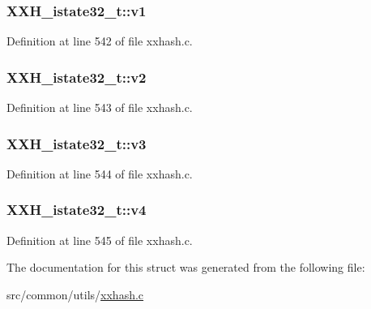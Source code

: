 \hypertarget{struct_x_x_h__istate32__t_abe7ccbc29303d4f4126d7c1c6003e67a}{}
\subsubsection[{v1}]{ X\+X\+H\+\_\+istate32\+\_\+t\+::v1}\label{struct_x_x_h__istate32__t_abe7ccbc29303d4f4126d7c1c6003e67a}


Definition at line 542 of file xxhash.\+c.

\hypertarget{struct_x_x_h__istate32__t_a2e56f8d3931253d5706f6354c228e7c4}{}
\subsubsection[{v2}]{ X\+X\+H\+\_\+istate32\+\_\+t\+::v2}\label{struct_x_x_h__istate32__t_a2e56f8d3931253d5706f6354c228e7c4}


Definition at line 543 of file xxhash.\+c.

\hypertarget{struct_x_x_h__istate32__t_ae19dc091e2c1c51e516024137603cd4a}{}
\subsubsection[{v3}]{ X\+X\+H\+\_\+istate32\+\_\+t\+::v3}\label{struct_x_x_h__istate32__t_ae19dc091e2c1c51e516024137603cd4a}


Definition at line 544 of file xxhash.\+c.

\hypertarget{struct_x_x_h__istate32__t_a8ca5625843153eb81437e9cee7364c1c}{}
\subsubsection[{v4}]{ X\+X\+H\+\_\+istate32\+\_\+t\+::v4}\label{struct_x_x_h__istate32__t_a8ca5625843153eb81437e9cee7364c1c}


Definition at line 545 of file xxhash.\+c.



The documentation for this struct was generated from the following file\+:\begin{DoxyCompactItemize}
\item 
src/common/utils/\hyperlink{xxhash_8c}{xxhash.\+c}\end{DoxyCompactItemize}
